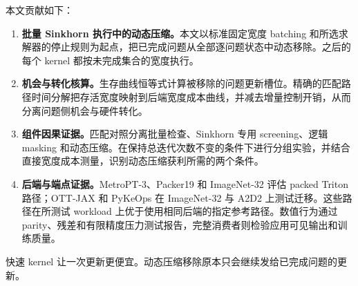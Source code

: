 本文贡献如下：
\begin{enumerate}[leftmargin=*,itemsep=2pt,topsep=3pt]
  \item \textbf{批量 Sinkhorn 执行中的动态压缩。}本文以标准固定宽度 batching 和所选求解器的停止规则为起点，把已完成问题从全部逐问题状态中动态移除。之后的每个 kernel 都按未完成集合的宽度执行。
  \item \textbf{机会与转化核算。}生存曲线恒等式计算被移除的问题更新槽位。精确的匹配路径时间分解把存活宽度映射到后端宽度成本曲线，并减去增量控制开销，从而分离问题侧机会与硬件转化。
  \item \textbf{组件因果证据。}匹配对照分离批量检查、Sinkhorn 专用 screening、逻辑 masking 和动态压缩。在保持总迭代次数不变的条件下进行分组实验，并结合直接宽度成本测量，识别动态压缩获利所需的两个条件。
  \item \textbf{后端与端点证据。}MetroPT-3、Packer19 和 ImageNet-32 评估 packed Triton 路径；OTT-JAX 和 PyKeOps 在 ImageNet-32 与 A2D2 上测试迁移。这些路径在所测试 workload 上优于使用相同后端的指定参考路径。数值行为通过 parity、残差和有限精度压力测试报告，完整消费者则检验应用可见输出和训练质量。
\end{enumerate}

快速 kernel 让一次更新更便宜。动态压缩移除原本只会继续发给已完成问题的更新。
